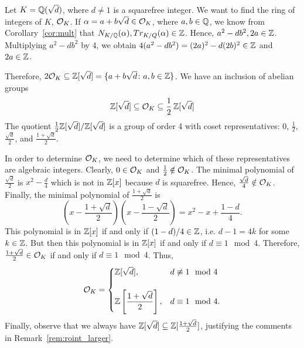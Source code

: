 \begin{ex}
Let $K= \mathbb{Q}(\sqrt{d})$, where $d \neq 1$ is a squarefree integer. We want to find the ring of integers of $K$, $\mathcal{O}_K$. If $\alpha= a + b\sqrt{d} \in \mathcal{O}_K$, where $a, b \in \mathbb{Q}$, we know from Corollary~\ref{cor:mult} that $N_{K/\mathbb{Q}}(\alpha), Tr_{K/Q}(\alpha) \in \mathbb{Z}$. Hence, $a^2 - db^2, 2a \in \mathbb{Z}$. Multiplying $a^2 - db^2$ by 4, we obtain $4(a^2 - db^2)= (2a)^2 - d(2b)^2 \in \mathbb{Z}$ and $2a \in \mathbb{Z}$.

Therefore, $2\mathcal{O}_K \subseteq \mathbb{Z}[\sqrt{d}]= \{ a + b\sqrt{d} \colon a,b \in \mathbb{Z} \}$. We have an inclusion of abelian groups
	\[
	\mathbb{Z}[\sqrt{d}] \subseteq \mathcal{O}_K \subseteq \dfrac{1}{2}\, \mathbb{Z}[\sqrt{d}]
	\]
The quotient $\frac{1}{2}\mathbb{Z}[\sqrt{d}]/\mathbb{Z}[\sqrt{d}]$ is a group of order 4 with coset representatives: 0, $\frac{1}{2}$, $\frac{\sqrt{d}}{2}$, and $\frac{1+\sqrt{d}}{2}$. 

In order to determine $\mathcal{O}_K$, we need to determine which of these representatives are algebraic integers. Clearly, $0 \in \mathcal{O}_K$ and $\frac{1}{2} \notin \mathcal{O}_K$. The minimal polynomial of $\frac{\sqrt{d}}{2}$ is $x^2 - \frac{d}{4}$ which is not in $\mathbb{Z}[x]$ because $d$ is squarefree. Hence, $\frac{\sqrt{d}}{4} \notin \mathcal{O}_K$. Finally, the minimal polynomial of $\frac{1 + \sqrt{d}}{2}$ is
	\[
	\left(x - \dfrac{1 + \sqrt{d}}{2} \right) \left(x - \dfrac{1 - \sqrt{d}}{2} \right)= x^2 - x + \dfrac{1 - d}{4}.
	\]
This polynomial is in $\mathbb{Z}[x]$ if and only if $(1-d)/4 \in \mathbb{Z}$, i.e. $d-1= 4k$ for some $k \in \mathbb{Z}$. But then this polynomial is in $\mathbb{Z}[x]$ if and only if $d \equiv 1\mod 4$. Therefore, $\frac{1+\sqrt{d}}{2} \in \mathcal{O}_K$ if and only if $d \equiv 1 \mod 4$. Thus,
	\[
	\mathcal{O}_K=
	\begin{cases}
	\mathbb{Z}[\sqrt{d}], & d \not\equiv 1 \mod 4 \\ \\
	\mathbb{Z}\left[ \dfrac{1+\sqrt{d}}{2} \right], & d \equiv 1 \mod 4. 
	\end{cases} 
	\] 
Finally, observe that we always have $\mathbb{Z}[\sqrt{d}] \subseteq \mathbb{Z}[\frac{1+\sqrt{d}}{2}]$, justifying the comments in Remark~\ref{rem:roint_larger}. 
\end{ex}


